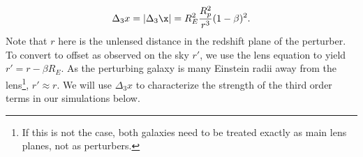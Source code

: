 \begin{equation}
\Delta_3 x = | \Delta_3 \x| = R_E^2 \frac{R_p^2}{r^3} (1 - \beta)^2. 
\end{equation}
Note that $r$ here is the unlensed distance in the redshift plane of the perturber. To convert to offset as observed on the sky $r'$, we use the lens equation to yield $r' = r - \beta R_E$. As the perturbing galaxy is many Einstein radii away from the lens\footnote{If this is not the case, both galaxies need to be treated exactly as main lens planes, not as perturbers.}, $r' \approx r$. We will use $\Delta_3 x$ to characterize the strength of the third order terms in our simulations below.
  
  